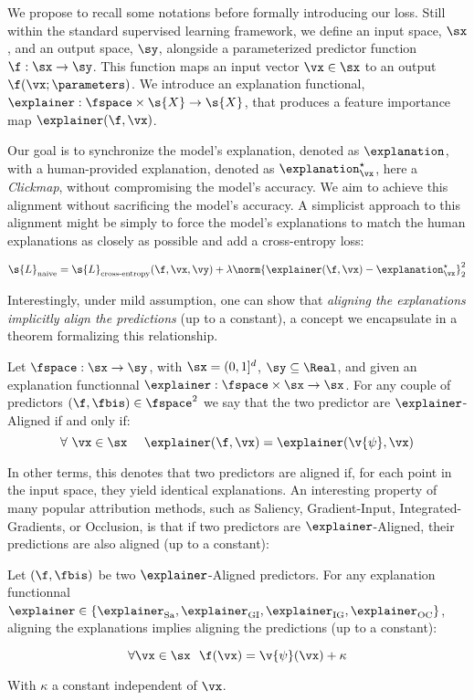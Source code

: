 We propose to recall some notations before formally introducing our loss. Still within the standard supervised learning framework, we define an input space, $\sx$, and an output space, $\sy$, alongside a parameterized predictor function $\f : \sx \to \sy$. This function maps an input vector $\vx \in \sx$ to an output $\f(\vx;\parameters)$. We introduce an explanation functional, $\explainer : \fspace \times \s{X} \to \s{X}$, that produces a feature importance map $\explainer(\f, \vx)$. 

Our goal is to synchronize the model's explanation, denoted as $\explanation$, with a human-provided explanation, denoted as $\explanation^\star_{\vx}$, here a \textit{Clickmap}, without compromising the model's accuracy. We aim to achieve this alignment without sacrificing the model's accuracy. A simplicist approach to this alignment might be simply to force the model's explanations to match the human explanations as closely as possible and add a cross-entropy loss:

$$
\s{L}_{\text{naive}} = \s{L}_{\text{cross-entropy}}(\f, \vx, \vy) + \lambda \norm{\explainer(\f, \vx) - \explanation^\star_{\vx}}_2^2
$$

Interestingly, under mild assumption, one can show that \textit{aligning the explanations implicitly align the predictions} (up to a constant), a concept we encapsulate in a theorem formalizing this relationship.

\begin{definition}
Let $\fspace : \sx \to \sy$, with $\sx = (0, 1]^d$, $\sy \subseteq \Real$, and given an explanation functionnal $\explainer : \fspace \times \sx \to \sx$. For any couple of predictors $(\f, \fbis) \in \fspace^2$ we say that the two predictor are $\explainer$-Aligned if and only if:
$$
\forall ~ \vx \in \sx ~~~~
\explainer(\f, \vx) = \explainer(\v{\psi}, \vx)
$$

\end{definition}

In other terms, this denotes that two predictors are aligned if, for each point in the input space, they yield identical explanations. An interesting property of many popular attribution methods, such as Saliency, Gradient-Input, Integrated-Gradients, or Occlusion, is that if two predictors are $\explainer$-Aligned, their predictions are also aligned (up to a constant):

\begin{theorem}
Let $(\f, \fbis)$ be two $\explainer$-Aligned predictors. For any explanation functionnal $\explainer \in \{ \explainer_{\text{Sa}}, \explainer_{\text{GI}}, \explainer_{\text{IG}}, \explainer_{\text{OC}} \}$, aligning the explanations implies aligning the predictions (up to a constant):

$$
\forall \vx \in \sx ~~ \f(\vx) = \v{\psi}(\vx) + \kappa
$$

With $\kappa$ a constant independent of $\vx$.

\end{theorem}

